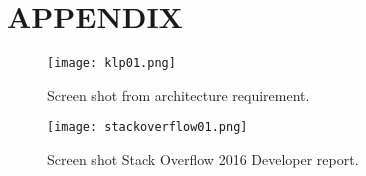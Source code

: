 \documentclass[a4paper, 10pt, conference]{ieeeconf}      %
\begin{document}
\addtolength{\textheight}{-12cm}
\onecolumn
\section{APPENDIX}
\begin{figure}[H]
  \centering
    \texttt{[image: klp01.png]}
  \caption{Screen shot from architecture requirement.}
  \label{fig:klp}
\end{figure}
\begin{figure}
  \centering
    \texttt{[image: stackoverflow01.png]}
  \caption{Screen shot Stack Overflow 2016 Developer report.}
  \label{fig:so}
\end{figure}
\newpage
\twocolumn
\end{document}
